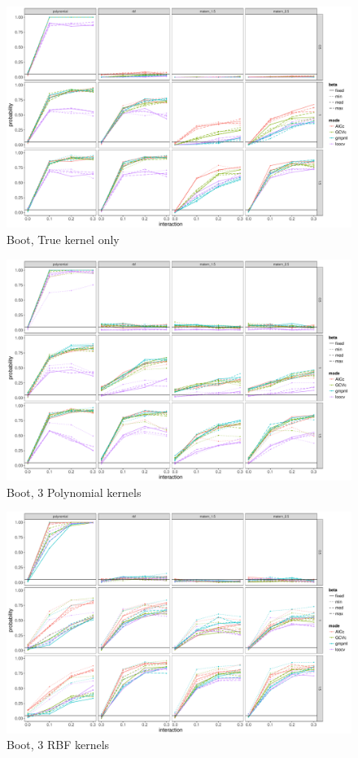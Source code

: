 \documentclass[11pt]{article}
\begin{document}
\begin{figure}
\begin{center}
\includegraphics[width=0.9\columnwidth]{exp_B1} 
\caption{Boot, True kernel only}
\label{fig:res}
\end{center}
\end{figure}

\begin{figure}
\begin{center}
\includegraphics[width=0.9\columnwidth]{exp_B2} 
\caption{Boot, 3 Polynomial kernels}
\label{fig:res}
\end{center}
\end{figure}

\begin{figure}
\begin{center}
\includegraphics[width=0.9\columnwidth]{exp_B3} 
\caption{Boot, 3 RBF kernels}
\label{fig:res}
\end{center}
\end{figure}
\end{document}
